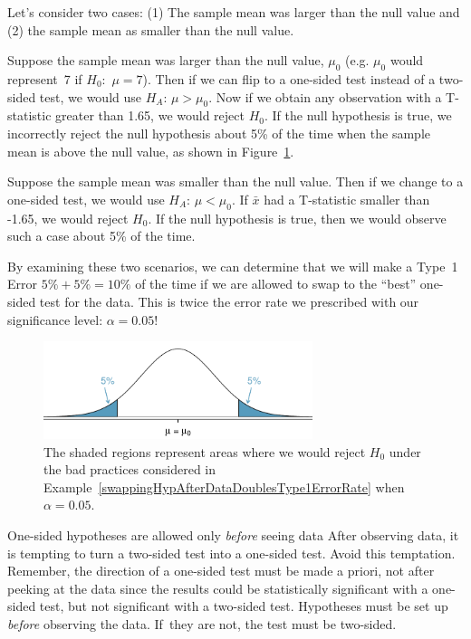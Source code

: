 \begin{example}{Let's consider two cases: (1) The sample mean was larger than the null value and (2) the sample mean as smaller than the null value. 

Suppose the sample mean was larger than the null value, $\mu_0$ (e.g. $\mu_0$ would represent~7 if $H_0$:~$\mu = 7$). Then if we can flip to a one-sided test instead of a two-sided test, we would use $H_A$: $\mu > \mu_0$. Now if we obtain any observation with a T-statistic greater than 1.65, we would reject $H_0$. If the null hypothesis is true, we incorrectly reject the null hypothesis about 5\% of the time when the sample mean is above the null value, as shown in Figure~\ref{type1ErrorDoublingExampleFigure}.

Suppose the sample mean was smaller than the null value. Then if we change to a one-sided test, we would use $H_A$: $\mu < \mu_0$. If $\bar{x}$ had a T-statistic smaller than -1.65, we would reject $H_0$. If the null hypothesis is true, then we would observe such a case about 5\% of the time.}

By examining these two scenarios, we can determine that we will make a Type~1 Error $5\%+5\%=10\%$ of the time if we are allowed to swap to the ``best'' one-sided test for the data. This is twice the error rate we prescribed with our significance level: $\alpha=0.05$! 

\begin{figure}
   \centering
   \includegraphics[width=0.7\textwidth]{ch_inference_foundations_oi_biostat/figures/type1ErrorDoublingExampleFigure/type1ErrorDoublingExampleFigure}
   \caption{The shaded regions represent areas where we would reject $H_0$ under the bad practices considered in Example~\ref{swappingHypAfterDataDoublesType1ErrorRate} when $\alpha = 0.05$.}
   \label{type1ErrorDoublingExampleFigure}
\end{figure}

\end{example}

\begin{caution}{One-sided hypotheses are allowed only \emph{before} seeing data}
{After observing data, it is tempting to turn a two-sided test into a one-sided test. Avoid this temptation. Remember, the direction of a one-sided test must be made a priori, not after peeking at the data since the results could be statistically significant with a one-sided test, but not significant with a two-sided test. Hypotheses must be set up \emph{before} observing the data. If~they are not, the test must be two-sided.}
\end{caution}

